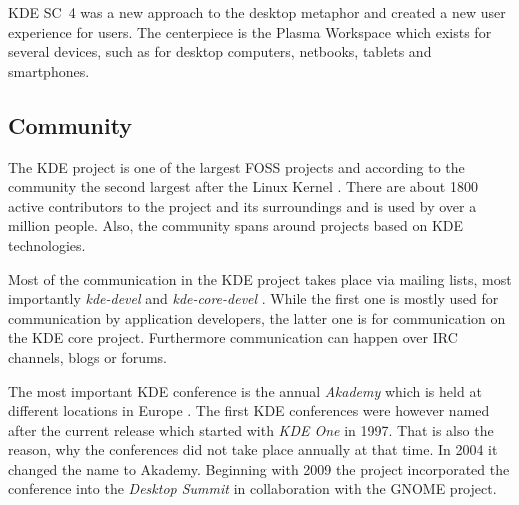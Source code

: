 \ac{KDE SC}~4 was a new approach to the desktop metaphor and created a new user
experience for users. The centerpiece is the Plasma Workspace which exists for
several devices, such as for desktop computers, netbooks, tablets and
smartphones.


\subsection{Community} %

The KDE project is one of the largest FOSS projects and according to the
community the second largest after the Linux Kernel \cite{KDEPress}. There are
about 1800 active contributors to the project and its surroundings and is used
by over a million people. Also, the community spans around projects based on
KDE technologies.

Most of the communication in the KDE project takes place via mailing lists,
most importantly \emph{kde-devel} and \emph{kde-core-devel}
\cite{KDEProjectManagement,KDEContribute}. While the first one is mostly used
for communication by application developers, the latter one is for
communication on the KDE core project. Furthermore communication can happen
over \ac{IRC} channels, blogs or forums.

The most important KDE conference is the annual \emph{Akademy} which is held at
different locations in Europe \cite{KDEHistory}. The first KDE conferences were
however named after the current release which started with \emph{KDE One} in
1997. That is also the reason, why the conferences did not take place annually
at that time. In 2004 it changed the name to Akademy. Beginning with 2009 the
project incorporated the conference into the \emph{Desktop Summit} in
collaboration with the GNOME project.


